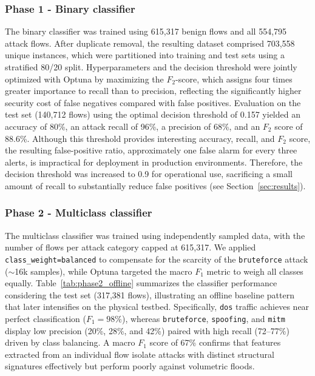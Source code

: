 \documentclass[conference]{IEEEtran}
\begin{document}
\subsubsection{Phase 1 - Binary classifier} The binary classifier was trained using 615,317 benign flows and all 554,795 attack flows. After duplicate removal, the resulting dataset comprised 703,558 unique instances, which were partitioned into training and test sets using a stratified 80/20 split. Hyperparameters and the decision threshold were jointly optimized with Optuna by maximizing the $F_2$-score, which assigns four times greater importance to recall than to precision, reflecting the significantly higher security cost of false negatives compared with false positives. Evaluation on the test set (140,712 flows) using the optimal decision threshold of 0.157 yielded an accuracy of 80\%, an attack recall of 96\%, a precision of 68\%, and an $F_2$ score of 88.6\%. Although this threshold provides interesting accuracy, recall, and  $F_2$ score, the resulting false-positive ratio, approximately one false alarm for every three alerts, is impractical for deployment in production environments. Therefore, the decision threshold was increased to 0.9 for operational use, sacrificing a small amount of recall to substantially reduce false positives (see Section~\ref{sec:results}).

\subsubsection{Phase 2 - Multiclass classifier}
The multiclass classifier was trained using independently sampled data, with the number of flows per attack category capped at 615,317. We applied  \texttt{class\_weight=balanced} to compensate for the scarcity of the \texttt{bruteforce} attack ($\sim$16k samples), while Optuna targeted the macro $F_1$ metric to weigh all classes equally. Table~\ref{tab:phase2_offline} summarizes the classifier performance considering the test set (317,381 flows), illustrating an offline baseline pattern that later intensifies on the physical testbed.
Specifically, \texttt{dos} traffic achieves near perfect classification ($F_1 = 98\%$), whereas \texttt{bruteforce}, \texttt{spoofing}, and \texttt{mitm} display low precision (20\%, 28\%, and 42\%) paired with high recall (72--77\%) driven by class balancing. A macro $F_1$ score of 67\% confirms that features extracted from an individual flow isolate attacks with distinct structural signatures effectively but perform poorly against volumetric floods.
\end{document}
